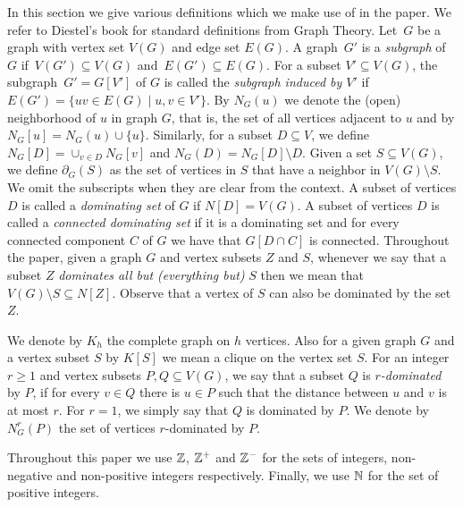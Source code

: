 \documentclass[11pt]{article}
\newcommand{\mar}[1]{#1}
\begin{document}
In this section we give various definitions which we make use of in the paper. We refer to Diestel's book 
\cite{diestelbook} for standard definitions from Graph Theory.
 Let~$G$ be a graph with vertex set $V(G)$ and edge set $E(G)$.  A graph~$G' $ is a
 \emph{subgraph} of~$G$ if~$V(G') \subseteq V(G)$ and~$E(G') \subseteq E(G)$.
 For a subset $V'\subseteq V(G)$, the subgraph~$G'=G[V']$ of $G$ is called the   \emph{subgraph induced  by $V'$}  if~$E(G')
 = \{uv \in E(G) \mid u,v \in V'\}$.
By $N_G(u)$
we denote the (open) neighborhood of $u$ in graph $G$, that is, the set of all vertices
adjacent to $u$ and by $N_G[u]=N_G(u)\cup \{u\}$. 
Similarly, for a subset $D \subseteq V$, we define $N_G[D]=\cup_{v\in D} N_G[v]$
and $N_G(D)=N_G[D]\setminus D$.  Given a set $S\subseteq V (G)$, we define $\partial_G(S)$ as the set of vertices in 
$S$ that have a neighbor in $V(G) \setminus S$.  We omit the subscripts when they are clear from the context. A subset of vertices $D$ is called a {\em dominating set} of $G$ if 
$N[D]=V(G)$. A subset of vertices $D$  is called a {\em connected dominating set} if it is a dominating set and for every connected component $C$ of $G$ we have that $G[D\cap C]$ is connected. Throughout the paper, given a graph $G$ and vertex subsets $Z$ and $S$, whenever we say that a subset $Z$ 
{\em dominates all but (everything but)} $S$ then we mean that $V(G)\setminus S \subseteq N[Z]$. Observe that a vertex of $S$ can also be dominated by the set $Z$. 


\medskip


We denote by $K_h$ the complete graph on $h$ vertices. Also for a given graph $G$ and a vertex subset $S$ by $K[S]$ we mean a clique on 
the vertex set $S$. 
For an integer $r\geq 1$ and  vertex subsets $P,Q\subseteq V(G)$, we say that a subset $Q$ is \emph{$r$-dominated} by $P$, if for every $v\in Q$  there is $u\in P$ such that the distance between $u$ and $v$ is at most $r$. For $r=1$, we simply say that $Q$ is dominated by $P$.  We denote by  $N^r_G(P)$ the set of vertices $r$-dominated by $P$.  

Throughout this paper we use $\mar{\Bbb{Z}}$,  $\mar{\Bbb{Z}^{+}}$  and  $\mar{\Bbb{Z}^{-}}$  for the sets of  integers,  non-negative and 
non-positive integers respectively.   Finally,  we use $\mar{\Bbb{N}}$ for the set of positive integers.
\end{document}

